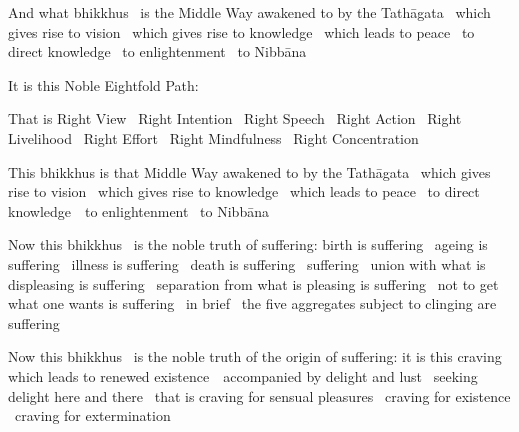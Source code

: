 \begin{english-only-hang}
  And what bhikkhus \breathmark\ is the Middle Way awakened to by the Tathāgata \breathmark\ which gives rise to vision \breathmark\ which gives rise to knowledge \breathmark\  which leads to peace \breathmark\ to direct knowledge \breathmark\ to enlightenment \breathmark\ to Nibbāna
\end{english-only-hang}

\begin{english-only-hang}
  It is this Noble Eightfold Path:
\end{english-only-hang}

\begin{english-only-hang}
  That is Right View \breathmark\ Right Intention \breathmark\ Right Speech \breathmark\ Right Action \breathmark\ Right Livelihood \breathmark\ Right Effort \breathmark\ Right Mindfulness \breathmark\ Right Concentration
\end{english-only-hang}

\begin{english-only-hang}
  This bhikkhus is that Middle Way awakened to by the Tathāgata \breathmark\ which gives rise to vision \breathmark\ which gives rise to knowledge \breathmark\ which leads to peace \breathmark\ to direct \mbox{knowledge}~\breathmark\ to enlightenment \breathmark\ to Nibbāna
\end{english-only-hang}

\begin{english-only-hang}
  Now this bhikkhus \breathmark\ is the noble truth of suffering: birth is suffering \breathmark\ ageing is suffering \breathmark\ illness is suffering \breathmark\ death is \ifbfive \mbox{suffering}~ \else suffering \breathmark\ \fi union with what is displeasing is suffering \breathmark\ separation from what is pleasing is suffering \breathmark\ not to get what one wants is suffering \breathmark\ in brief \breathmark\ the five aggregates subject to clinging are suffering
\end{english-only-hang}

\begin{english-only-hang}
  Now this bhikkhus \breathmark\ is the noble truth of the origin of suffering: it is this craving  which leads to renewed \mbox{existence}~\breathmark\ accompanied by delight and lust \breathmark\ seeking delight here and there \breathmark\ that is craving for sensual pleasures \breathmark\ craving for existence \breathmark\ craving for extermination
\end{english-only-hang}


